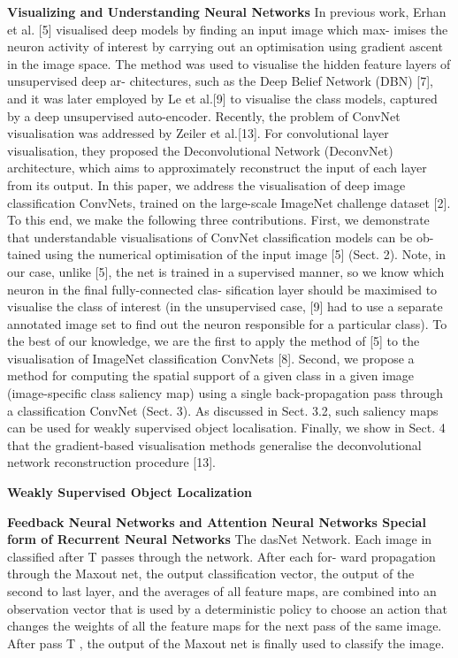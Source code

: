 \textbf{Visualizing and Understanding Neural Networks}
In previous work, Erhan et al. [5] visualised deep models by finding an input image which max- imises the neuron activity of interest by carrying out an optimisation using gradient ascent in the image space. The method was used to visualise the hidden feature layers of unsupervised deep ar- chitectures, such as the Deep Belief Network (DBN) [7], and it was later employed by Le et al.[9] to visualise the class models, captured by a deep unsupervised auto-encoder. Recently, the problem of ConvNet visualisation was addressed by Zeiler et al.[13]. For convolutional layer visualisation, they proposed the Deconvolutional Network (DeconvNet) architecture, which aims to approximately reconstruct the input of each layer from its output.
In this paper, we address the visualisation of deep image classification ConvNets, trained on the large-scale ImageNet challenge dataset [2]. To this end, we make the following three contributions. First, we demonstrate that understandable visualisations of ConvNet classification models can be ob- tained using the numerical optimisation of the input image [5] (Sect. 2). Note, in our case, unlike [5], the net is trained in a supervised manner, so we know which neuron in the final fully-connected clas- sification layer should be maximised to visualise the class of interest (in the unsupervised case, [9] had to use a separate annotated image set to find out the neuron responsible for a particular class). To the best of our knowledge, we are the first to apply the method of [5] to the visualisation of ImageNet classification ConvNets [8]. Second, we propose a method for computing the spatial support of a given class in a given image (image-specific class saliency map) using a single back-propagation pass through a classification ConvNet (Sect. 3). As discussed in Sect. 3.2, such saliency maps can be used for weakly supervised object localisation. Finally, we show in Sect. 4 that the gradient-based visualisation methods generalise the deconvolutional network reconstruction procedure [13].

\textbf{Weakly Supervised Object Localization}

\textbf{Feedback Neural Networks and Attention Neural Networks  Special form of Recurrent Neural Networks}
The dasNet Network. Each image in classified after T passes through the network. After each for- ward propagation through the Maxout net, the output classification vector, the output of the second to last layer, and the averages of all feature maps, are combined into an observation vector that is used by a deterministic policy to choose an action that changes the weights of all the feature maps for the next pass of the same image. After pass T , the output of the Maxout net is finally used to classify the image.

